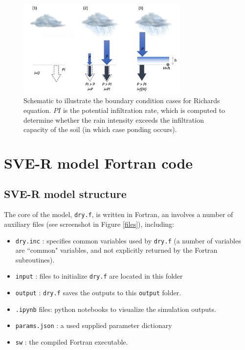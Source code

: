 \documentclass{article}
\newcommand{\code}[1]{\texttt{#1}}
\begin{document}
 	
 \begin{figure}[h]
 \centering
\includegraphics[width=20pc]{grid/richards.png}
 \caption{Schematic to illustrate the boundary condition cases for Richards equation. $PI$ is the potential infiltration rate, which is computed to determine whether the rain intensity exceeds the infiltration capacity of the soil (in which case ponding occurs).}
 \label{richardgrid}
 \end{figure}	


\newpage

\section{SVE-R model Fortran code}
\label{SVE_solver}

\subsection{SVE-R model structure}

The core of the model, \code{dry.f}, is written in Fortran, an involves a number of auxiliary files (see screenshot in Figure \ref{files}), including:

\begin{itemize}
	\item \code{\code{dry.inc}} : specifies common variables used by \code{dry.f}  (a number of variables are ``common" variables, and not explicitly returned by the Fortran subroutines). 
	\item \code{input} :  files to initialize \code{dry.f} are located in this folder
	\item \code{output} : \code{dry.f} saves the outputs to this \code{output} folder.	
	\item  \code{.ipynb} files: python notebooks to visualize the simulation outputs.
	\item \code{params.json} : a used supplied parameter dictionary
	\item \code{sw} : the compiled Fortran executable.
\end{itemize}
 
\end{document}
